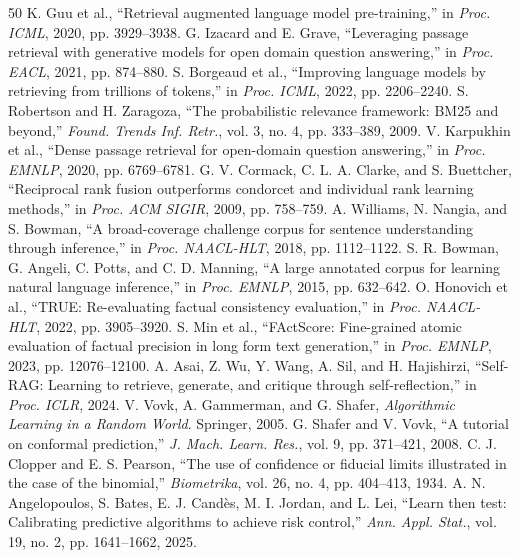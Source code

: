 \documentclass[10pt,conference]{IEEEtran}
\begin{document}
\begin{thebibliography}{50}
 K. Guu et al., ``Retrieval augmented language model pre-training,'' in \emph{Proc. ICML}, 2020, pp. 3929--3938.
 G. Izacard and E. Grave, ``Leveraging passage retrieval with generative models for open domain question answering,'' in \emph{Proc. EACL}, 2021, pp. 874--880.
 S. Borgeaud et al., ``Improving language models by retrieving from trillions of tokens,'' in \emph{Proc. ICML}, 2022, pp. 2206--2240.
 S. Robertson and H. Zaragoza, ``The probabilistic relevance framework: BM25 and beyond,'' \emph{Found. Trends Inf. Retr.}, vol. 3, no. 4, pp. 333--389, 2009.
 V. Karpukhin et al., ``Dense passage retrieval for open-domain question answering,'' in \emph{Proc. EMNLP}, 2020, pp. 6769--6781.
 G. V. Cormack, C. L. A. Clarke, and S. Buettcher, ``Reciprocal rank fusion outperforms condorcet and individual rank learning methods,'' in \emph{Proc. ACM SIGIR}, 2009, pp. 758--759.
 A. Williams, N. Nangia, and S. Bowman, ``A broad-coverage challenge corpus for sentence understanding through inference,'' in \emph{Proc. NAACL-HLT}, 2018, pp. 1112--1122.
 S. R. Bowman, G. Angeli, C. Potts, and C. D. Manning, ``A large annotated corpus for learning natural language inference,'' in \emph{Proc. EMNLP}, 2015, pp. 632--642.
 O. Honovich et al., ``TRUE: Re-evaluating factual consistency evaluation,'' in \emph{Proc. NAACL-HLT}, 2022, pp. 3905--3920.
 S. Min et al., ``FActScore: Fine-grained atomic evaluation of factual precision in long form text generation,'' in \emph{Proc. EMNLP}, 2023, pp. 12076--12100.
 A. Asai, Z. Wu, Y. Wang, A. Sil, and H. Hajishirzi, ``Self-RAG: Learning to retrieve, generate, and critique through self-reflection,'' in \emph{Proc. ICLR}, 2024.
 V. Vovk, A. Gammerman, and G. Shafer, \emph{Algorithmic Learning in a Random World}. Springer, 2005.
 G. Shafer and V. Vovk, ``A tutorial on conformal prediction,'' \emph{J. Mach. Learn. Res.}, vol. 9, pp. 371--421, 2008.
 C. J. Clopper and E. S. Pearson, ``The use of confidence or fiducial limits illustrated in the case of the binomial,'' \emph{Biometrika}, vol. 26, no. 4, pp. 404--413, 1934.
 A. N. Angelopoulos, S. Bates, E. J. Cand\`es, M. I. Jordan, and L. Lei, ``Learn then test: Calibrating predictive algorithms to achieve risk control,'' \emph{Ann. Appl. Stat.}, vol. 19, no. 2, pp. 1641--1662, 2025.

\end{thebibliography}
\end{document}
